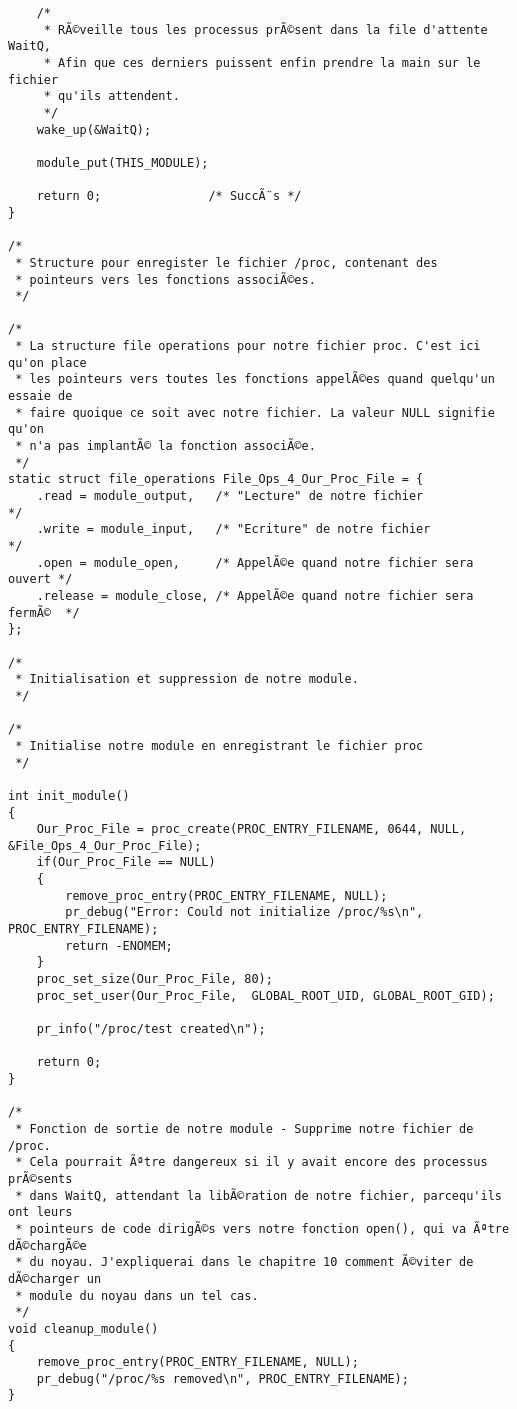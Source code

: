 \documentclass[11pt]{article}
\begin{document}
\begin{verbatim}
    /*
     * RÃ©veille tous les processus prÃ©sent dans la file d'attente WaitQ,
     * Afin que ces derniers puissent enfin prendre la main sur le fichier
     * qu'ils attendent.
     */
    wake_up(&WaitQ);

    module_put(THIS_MODULE);

    return 0;               /* SuccÃ¨s */
}

/*
 * Structure pour enregister le fichier /proc, contenant des
 * pointeurs vers les fonctions associÃ©es.
 */

/*
 * La structure file operations pour notre fichier proc. C'est ici qu'on place
 * les pointeurs vers toutes les fonctions appelÃ©es quand quelqu'un essaie de
 * faire quoique ce soit avec notre fichier. La valeur NULL signifie qu'on
 * n'a pas implantÃ© la fonction associÃ©e.
 */
static struct file_operations File_Ops_4_Our_Proc_File = {
    .read = module_output,   /* "Lecture" de notre fichier              */
    .write = module_input,   /* "Ecriture" de notre fichier             */
    .open = module_open,     /* AppelÃ©e quand notre fichier sera ouvert */
    .release = module_close, /* AppelÃ©e quand notre fichier sera fermÃ©  */
};

/*
 * Initialisation et suppression de notre module.
 */

/*
 * Initialise notre module en enregistrant le fichier proc
 */

int init_module()
{
    Our_Proc_File = proc_create(PROC_ENTRY_FILENAME, 0644, NULL, &File_Ops_4_Our_Proc_File);
    if(Our_Proc_File == NULL)
    {
        remove_proc_entry(PROC_ENTRY_FILENAME, NULL);
        pr_debug("Error: Could not initialize /proc/%s\n", PROC_ENTRY_FILENAME);
        return -ENOMEM;
    }
    proc_set_size(Our_Proc_File, 80);
    proc_set_user(Our_Proc_File,  GLOBAL_ROOT_UID, GLOBAL_ROOT_GID);

    pr_info("/proc/test created\n");

    return 0;
}

/*
 * Fonction de sortie de notre module - Supprime notre fichier de /proc.
 * Cela pourrait Ãªtre dangereux si il y avait encore des processus prÃ©sents
 * dans WaitQ, attendant la libÃ©ration de notre fichier, parcequ'ils ont leurs
 * pointeurs de code dirigÃ©s vers notre fonction open(), qui va Ãªtre dÃ©chargÃ©e
 * du noyau. J'expliquerai dans le chapitre 10 comment Ã©viter de dÃ©charger un
 * module du noyau dans un tel cas.
 */
void cleanup_module()
{
    remove_proc_entry(PROC_ENTRY_FILENAME, NULL);
    pr_debug("/proc/%s removed\n", PROC_ENTRY_FILENAME);
}
\end{verbatim}
\end{document}
